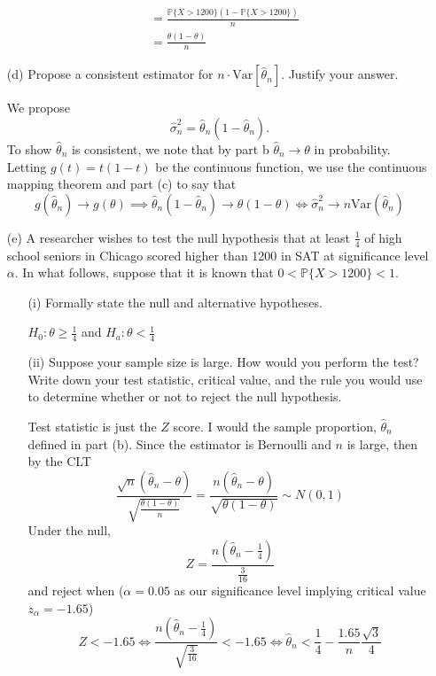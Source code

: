 \documentclass[11pt]{article}
\newcommand{\Var}{\text{Var}}
\newcommand{\bbP}{\mathbb{P}}
\begin{document}
\begin{enumerate}
\begin{solution}
\begin{align*}
        &= \frac{\bbP\{X >1200\}(1 - \bbP\{X >1200 \})}{n}\\
        &= \frac{\theta(1 - \theta)}{n}
    \end{align*}
\end{solution}
    \item[(d)] Propose a consistent estimator for \( n \cdot \text{Var}[\hat{\theta}_n] \). Justify your answer.
\begin{solution}
    We propose 
    \[\hat{\sigma}_n^2 = \hat{\theta}_n(1 - \hat{\theta}_n).\] To show $\hat{\theta}_n$ is consistent, we note that by part b $\hat{\theta}_n \to \theta$ in probability. Letting $g(t) = t(1 - t)$ be the continuous function, we use the continuous mapping theorem and part (c) to say that 
    \[g(\hat{\theta}_n) \to g(\theta) \implies \hat{\theta}_n(1-\hat{\theta}_n) \to \theta(1-\theta) \iff \hat{\sigma}_n^2 \to n\Var(\hat{\theta}_n)\]
\end{solution}
    \item[(e)] A researcher wishes to test the null hypothesis that at least \( \frac{1}{4} \) of high school seniors in Chicago scored higher than 1200 in SAT at significance level \( \alpha \). In what follows, suppose that it is known that \( 0 < \mathbb{P}\{X > 1200\} < 1 \).
    \begin{itemize}
        \item[(i)] Formally state the null and alternative hypotheses.
        \begin{solution}
            $H_0: \theta \geq \frac{1}{4}$ and $H_a: \theta < \frac{1}{4}$
        \end{solution}
        \item[(ii)] Suppose your sample size is large. How would you perform the test? Write down your test statistic, critical value, and the rule you would use to determine whether or not to reject the null hypothesis.
    \begin{solution}
        Test statistic is just the $Z$ score. I would the sample proportion, $\hat{\theta}_n$ defined in part (b). Since the estimator is Bernoulli and $n$ is large, then by the CLT 
        \[\frac{\sqrt{n}(\hat{\theta}_n - \theta)}{\sqrt{\frac{\theta(1-\theta)}{n}}} = \frac{n(\hat{\theta}_n - \theta)}{\sqrt{\theta(1-\theta)}}\sim N(0,1)\] Under the null, 
        \[Z = \frac{n(\hat{\theta}_n - \frac{1}{4})}{\frac{3}{16}}\] and reject when ($\alpha = 0.05$ as our significance level implying critical value $z_{\alpha} = -1.65$)
        \[Z  < -1.65 \iff \frac{n(\hat{\theta}_n - \frac{1}{4})}{\sqrt{\frac{3}{16}}} < -1.65 \iff \hat{\theta}_n < \frac{1}{4}-\frac{1.65}{n}{\frac{\sqrt{3}}{4}}\]

\end{solution}
\end{itemize}
\end{enumerate}
\end{document}
